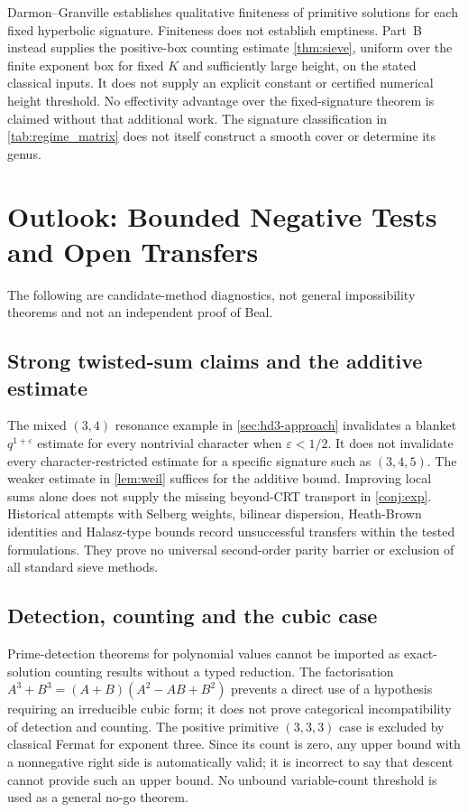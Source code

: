 \documentclass[11pt,a4paper]{article}
\begin{document}
Darmon--Granville \cite{DarmonGranville1995} establishes qualitative
finiteness of primitive solutions for each fixed hyperbolic
signature. Finiteness does not establish emptiness.
Part~B instead supplies the positive-box counting estimate
\cref{thm:sieve}, uniform over the finite exponent box for fixed $K$
and sufficiently large height, on the stated classical inputs.
It does not supply an explicit constant or certified numerical height
threshold. No effectivity advantage over the fixed-signature theorem
is claimed without that additional work. The signature classification
in \cref{tab:regime_matrix} does not itself construct a smooth cover
or determine its genus.

\section{Outlook: Bounded Negative Tests and Open Transfers}
\label{sec:outlook}

The following are candidate-method diagnostics, not general
impossibility theorems and not an independent proof of Beal.

\subsection{Strong twisted-sum claims and the additive estimate}
\label{sec:outlook-elim1}

The mixed $(3,4)$ resonance example in \cref{sec:hd3-approach}
invalidates a blanket $q^{1+\varepsilon}$ estimate for every
nontrivial character when $\varepsilon<1/2$.
It does not invalidate every character-restricted estimate for a
specific signature such as $(3,4,5)$.
The weaker estimate in \cref{lem:weil} suffices for the additive
bound. Improving local sums alone does not supply the missing
beyond-CRT transport in \cref{conj:exp}.
Historical attempts with Selberg weights, bilinear dispersion,
Heath-Brown identities and Halasz-type bounds
\cite{BFI1986,HB1982,HalaszPretentious} record unsuccessful transfers
within the tested formulations. They prove no universal second-order
parity barrier or exclusion of all standard sieve methods.

\subsection{Detection, counting and the cubic case}
\label{sec:outlook-elim2}

Prime-detection theorems for polynomial values
\cite{FI1998a,FI1998b,HB2001,HBMoroz2002,Merikoski2022} cannot be
imported as exact-solution counting results without a typed reduction.
The factorisation $A^3+B^3=(A+B)(A^2-AB+B^2)$ prevents a direct use
of a hypothesis requiring an irreducible cubic form; it does not
prove categorical incompatibility of detection and counting.
The positive primitive $(3,3,3)$ case is excluded by classical
Fermat for exponent three. Since its count is zero, any upper bound
with a nonnegative right side is automatically valid; it is
incorrect to say that descent cannot provide such an upper bound.
No unbound variable-count threshold is used as a general no-go theorem.
\end{document}
